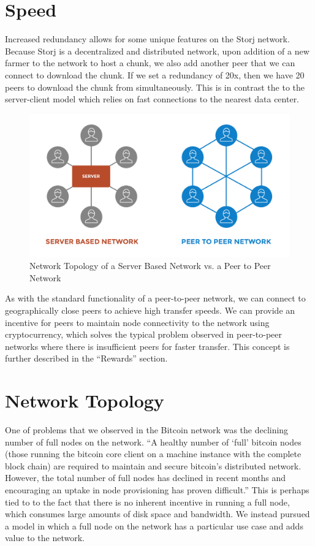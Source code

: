 \documentclass[a4paper,10pt]{article}
\begin{document}
\section{Speed}
Increased redundancy allows for some unique features on the Storj network. Because Storj is a decentralized and distributed network, upon addition of a new farmer to the network to host a chunk, we also add another peer that we can connect to download the chunk. If we set a redundancy of 20x, then we have 20 peers to download the chunk from simultaneously. This is in contrast the to the server-client model which relies on fast connections to the nearest data center.\\

\begin{figure}[h!]
\centering
\includegraphics[width=\linewidth]{5}
\caption{Network Topology of a Server Based Network vs. a Peer to Peer Network}
\end{figure}

As with the standard functionality of a peer-to-peer network, we can connect to geographically close peers to achieve high transfer speeds. We can provide an incentive for peers to maintain node connectivity to the network using cryptocurrency, which solves the typical problem observed in peer-to-peer networks where there is insufficient peers for faster transfer. This concept is further described in the “Rewards” section. 

\section{Network Topology}
One of problems that we observed in the Bitcoin network was the declining number of full nodes on the network. “A healthy number of ‘full’ bitcoin nodes (those running the bitcoin core client on a machine instance with the complete block chain) are required to maintain and secure bitcoin’s distributed network. However, the total number of full nodes has declined in recent months and encouraging an uptake in node provisioning has proven difficult.” \cite{8} This is perhaps tied to to the fact that there is no inherent incentive in running a full node, which consumes large amounts of disk space and bandwidth. We instead pursued a model in which a full node on the network has a particular use case and adds value to the network. \\
\end{document}

